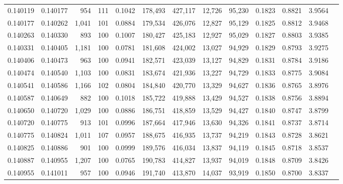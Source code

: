 \begin{tabular}{rrrrrrrrrrrrr}
0.140119 & 0.140177 &   954 & 111 &                                     0.1042 & 178,493 & 427,117 &  12,726 &  95,230 & 0.1823 & 0.8821 & 3.9564 \\
0.140177 & 0.140262 & 1,041 & 101 &                                     0.0884 & 179,534 & 426,076 &  12,827 &  95,129 & 0.1825 & 0.8812 & 3.9468 \\
0.140263 & 0.140330 &   893 & 100 &                                     0.1007 & 180,427 & 425,183 &  12,927 &  95,029 & 0.1827 & 0.8803 & 3.9385 \\
0.140331 & 0.140405 & 1,181 & 100 &                                     0.0781 & 181,608 & 424,002 &  13,027 &  94,929 & 0.1829 & 0.8793 & 3.9275 \\
0.140406 & 0.140473 &   963 & 100 &                                     0.0941 & 182,571 & 423,039 &  13,127 &  94,829 & 0.1831 & 0.8784 & 3.9186 \\
0.140474 & 0.140540 & 1,103 & 100 &                                     0.0831 & 183,674 & 421,936 &  13,227 &  94,729 & 0.1833 & 0.8775 & 3.9084 \\
0.140541 & 0.140586 & 1,166 & 102 &                                     0.0804 & 184,840 & 420,770 &  13,329 &  94,627 & 0.1836 & 0.8765 & 3.8976 \\
0.140587 & 0.140649 &   882 & 100 &                                     0.1018 & 185,722 & 419,888 &  13,429 &  94,527 & 0.1838 & 0.8756 & 3.8894 \\
0.140650 & 0.140720 & 1,029 & 100 &                                     0.0886 & 186,751 & 418,859 &  13,529 &  94,427 & 0.1840 & 0.8747 & 3.8799 \\
0.140720 & 0.140775 &   913 & 101 &                                     0.0996 & 187,664 & 417,946 &  13,630 &  94,326 & 0.1841 & 0.8737 & 3.8714 \\
0.140775 & 0.140824 & 1,011 & 107 &                                     0.0957 & 188,675 & 416,935 &  13,737 &  94,219 & 0.1843 & 0.8728 & 3.8621 \\
0.140825 & 0.140886 &   901 & 100 &                                     0.0999 & 189,576 & 416,034 &  13,837 &  94,119 & 0.1845 & 0.8718 & 3.8537 \\
0.140887 & 0.140955 & 1,207 & 100 &                                     0.0765 & 190,783 & 414,827 &  13,937 &  94,019 & 0.1848 & 0.8709 & 3.8426 \\
0.140955 & 0.141011 &   957 & 100 &                                     0.0946 & 191,740 & 413,870 &  14,037 &  93,919 & 0.1850 & 0.8700 & 3.8337 \\

\end{tabular}
